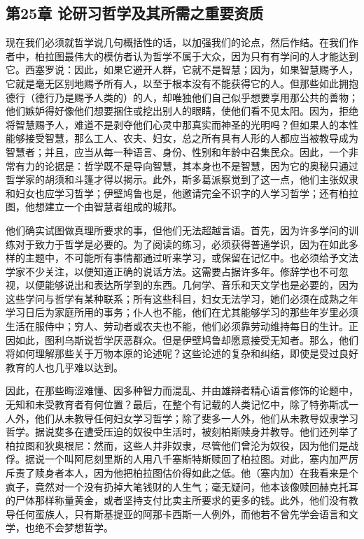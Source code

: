 
\subsection{第25章 论研习哲学及其所需之重要资质}

现在我们必须就哲学说几句概括性的话，以加强我们的论点，然后作结。在我们作者中，柏拉图最伟大的模仿者认为哲学不属于大众，因为只有有学问的人才能达到它。西塞罗说：因此，如果它避开人群，它就不是智慧；因为，如果智慧赐予人，它就是毫无区别地赐予所有人，以至于根本没有不能获得它的人。但那些如此拥抱德行（德行乃是赐予人类的）的人，却唯独他们自己似乎想要享用那公共的善物；他们嫉妒得好像他们想要捆住或挖出别人的眼睛，使他们看不见太阳。因为，拒绝将智慧赐予人，难道不是剥夺他们心灵中那真实而神圣的光明吗？但如果人的本性能够接受智慧，那么工人、农夫、妇女，总之所有具有人形的人都应当被教导成为智慧者；并且，应当从每一种语言、身份、性别和年龄中召集民众。因此，一个非常有力的论据是：哲学既不是导向智慧，其本身也不是智慧，因为它的奥秘只通过哲学家的胡须和斗篷才得以揭示。此外，斯多葛派察觉到了这一点，他们主张奴隶和妇女也应学习哲学；伊壁鸠鲁也是，他邀请完全不识字的人学习哲学；还有柏拉图，他想建立一个由智慧者组成的城邦。\par

他们确实试图做真理所要求的事，但他们无法超越言语。首先，因为许多学问的训练对于致力于哲学是必要的。为了阅读的练习，必须获得普通学识，因为在如此多样的主题中，不可能所有事情都通过听来学习，或保留在记忆中。也必须给予文法学家不少关注，以便知道正确的说话方法。这需要占据许多年。修辞学也不可忽视，以便能够说出和表达所学到的东西。几何学、音乐和天文学也是必要的，因为这些学问与哲学有某种联系；所有这些科目，妇女无法学习，她们必须在成熟之年学习日后为家庭所用的事务；仆人也不能，他们在尤其能够学习的那些年岁里必须生活在服侍中；穷人、劳动者或农夫也不能，他们必须靠劳动维持每日的生计。正因如此，图利乌斯说哲学厌恶群众。但是伊壁鸠鲁却愿意接受无知者。那么，他们将如何理解那些关于万物本原的论述呢？这些论述的复杂和纠结，即使是受过良好教育的人也几乎难以达到。\par

因此，在那些晦涩难懂、因多种智力而混乱、并由雄辩者精心语言修饰的论题中，无知和未受教育者有何位置？最后，在整个有记载的人类记忆中，除了特弥斯忒一人外，他们从未教导任何妇女学习哲学；除了斐多一人外，他们从未教导奴隶学习哲学。据说斐多在遭受压迫的奴役中生活时，被刻柏斯赎身并教导。他们还列举了柏拉图和狄奥根尼：然而，这些人并非奴隶，尽管他们曾沦为奴役，因为他们是战俘。据说一个叫阿尼刻里斯的人用八千塞斯特斯赎回了柏拉图。对此，塞内加严厉斥责了赎身者本人，因为他把柏拉图估价得如此之低。他（塞内加）在我看来是个疯子，竟然对一个没有扔掉大笔钱财的人生气；毫无疑问，他本该像赎回赫克托耳的尸体那样称量黄金，或者坚持支付比卖主所要求的更多的钱。此外，他们没有教导任何蛮族人，只有斯基提亚的阿那卡西斯一人例外，而他若不曾先学会语言和文学，也绝不会梦想哲学。\par

